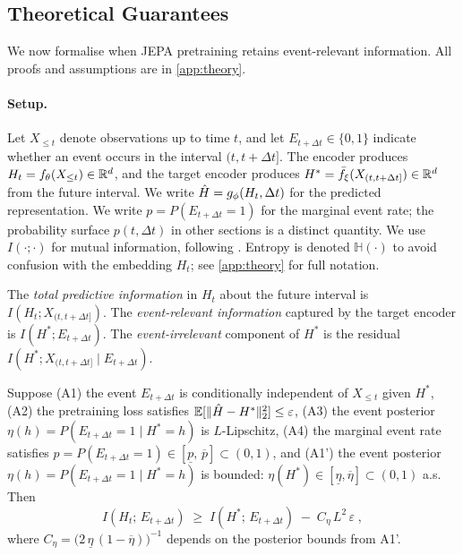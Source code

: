 
\subsection{Theoretical Guarantees}
\label{sec:theory}

We now formalise when JEPA pretraining retains event-relevant information.
All proofs and assumptions are in \cref{app:theory}.

\paragraph{Setup.}
Let $X_{\leq t}$ denote observations up to time $t$, and let $E_{t+\Delta t} \in \{0,1\}$ indicate whether an event occurs in the interval $(t, t+\Delta t]$.
The encoder produces $H_t = f_\theta(X_{\leq t}) \in \mathbb{R}^d$, and the target encoder produces $H^* = \bar{f}_\xi(X_{(t,t+\Delta t]}) \in \mathbb{R}^d$ from the future interval.
We write $\hat{H} = g_\phi(H_t, \Delta t)$ for the predicted representation.
We write $p = P(E_{t+\Delta t}=1)$ for the marginal event rate; the probability surface $p(t, \Delta t)$ in other sections is a distinct quantity.
We use $I(\cdot;\cdot)$ for mutual information, following \citet{cover2006elements}.
Entropy is denoted $\mathbb{H}(\cdot)$ to avoid confusion with the embedding $H_t$; see \cref{app:theory} for full notation.

\begin{definition}
\label{def:info_decomposition}
The \emph{total predictive information} in $H_t$ about the future interval is $I(H_t; X_{(t,t+\Delta t]})$.
The \emph{event-relevant information} captured by the target encoder is $I(H^*; E_{t+\Delta t})$.
The \emph{event-irrelevant} component of $H^*$ is the residual $I(H^*; X_{(t,t+\Delta t]} \mid E_{t+\Delta t})$.
\end{definition}

\begin{proposition}
\label{prop:retention}
Suppose \textup{(A1)} the event $E_{t+\Delta t}$ is conditionally independent of $X_{\leq t}$ given $H^*$,
\textup{(A2)} the pretraining loss satisfies $\mathbb{E}[\|\hat{H} - H^*\|_2^2] \leq \varepsilon$,
\textup{(A3)} the event posterior $\eta(h) = P(E_{t+\Delta t}=1 \mid H^*=h)$ is $L$-Lipschitz,
\textup{(A4)} the marginal event rate satisfies $p = P(E_{t+\Delta t}=1) \in [\underline{p},\, \overline{p}] \subset (0,1)$,
and \textup{(A1')} the event posterior $\eta(h) = P(E_{t+\Delta t}=1 \mid H^*=h)$ is bounded: $\eta(H^*) \in [\underline{\eta}, \overline{\eta}] \subset (0,1)$ a.s.
Then
\begin{equation}
\label{eq:main_bound}
I(H_t;\, E_{t+\Delta t}) \;\geq\; I(H^*;\, E_{t+\Delta t}) \;-\; C_\eta \, L^2 \, \varepsilon\;,
\end{equation}
where $C_\eta = \bigl(2\,\underline{\eta}\,(1-\overline{\eta})\bigr)^{-1}$ depends on the posterior bounds from A1'.
\end{proposition}

